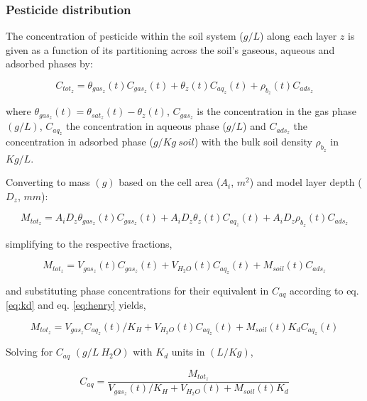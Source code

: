 \documentclass[]{article}
\begin{document}
\hypertarget{pesticide-distribution}{%
\subsubsection{Pesticide distribution}\label{pesticide-distribution}}

The concentration of pesticide within the soil system (\(g/L\)) along
each layer \(z\) is given as a function of its partitioning across the
soil's gaseous, aqueous and adsorbed phases by:

\begin{equation}
C_{tot_z} = \theta_{gas_z}(t)C_{gas_z}(t) + \theta_z(t)C_{aq_z}(t) + \rho_{b_z}(t)C_{ads_z}
\label{eq:conc_tot}  
\end{equation}

where \(\theta_{gas_z}(t) = \theta_{sat_z}(t) - \theta_{z}(t)\),
\(C_{gas_z}\) is the concentration in the gas phase \((g/L)\),
\(C_{aq_z}\) the concentration in aqueous phase (\(g/L\)) and
\(C_{ads_z}\) the concentration in adsorbed phase (\(g/Kg~soil\)) with
the bulk soil density \(\rho_{b_z}\) in \(Kg/L\).

Converting to mass \((g)\) based on the cell area (\(A_i\), \(m^2\)) and
model layer depth (\(D_z\), \(mm\)):

\begin{equation}
M_{tot_z} = A_iD_z\theta_{gas_z}(t)C_{gas_z}(t) + A_iD_z\theta_z(t)C_{aq_z}(t) + A_iD_z\rho_{b_z}(t)C_{ads_z}
\label{eq:mass_tot}  
\end{equation}

simplifying to the respective fractions,

\begin{equation}
M_{tot_z} = V_{gas_z}(t)C_{gas_z}(t) + V_{H_2O}(t)C_{aq_z}(t) + M_{soil}(t)C_{ads_z}
\label{eq:mass_tot_simple}  
\end{equation}

and substituting phase concentrations for their equivalent in \(C_{aq}\)
according to eq. \ref{eq:kd} and eq. \ref{eq:henry} yields,

\begin{equation}
M_{tot_z} = V_{gas_z}C_{aq_z}(t)/K_H + V_{H_2O}(t)C_{aq_z}(t) + M_{soil}(t)K_dC_{aq_z}(t)
\label{eq:mass_tot_sub}  
\end{equation}

Solving for \(C_{aq}\) \((g/L~H_2O)\) with \(K_d\) units in \((L/Kg)\),

\begin{equation}
C_{aq} = \frac{M_{tot_z} }{  V_{gas_z}(t)/K_H + V_{H_2O}(t) + M_{soil}(t)K_d }
\label{eq:mass_tot_conc_aq1}  
\end{equation}
\end{document}
